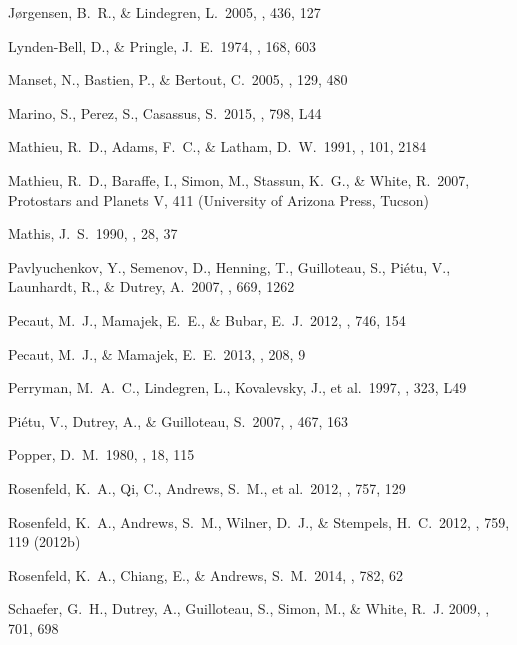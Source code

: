 \documentclass{aastex6}
\begin{document}
\begin{thebibliography}{}
 J{\o}rgensen, B.~R., \& Lindegren, L.\ 2005, \aap, 436, 127 

 Lynden-Bell, D., \& Pringle, J.~E.\ 1974, \mnras, 168, 603

 Manset, N., Bastien, P., 
\& Bertout, C.\ 2005, \aj, 129, 480 

 Marino, S., Perez, S., Casassus, S.\ 2015, \apj, 798, L44

 Mathieu, R.~D., Adams, 
F.~C., \& Latham, D.~W.\ 1991, \aj, 101, 2184 

 Mathieu, R.~D., 
Baraffe, I., Simon, M., Stassun, K.~G., 
\& White, R.\ 2007, Protostars and Planets V, 411 (University of Arizona Press, Tucson)

 Mathis, J.~S.\ 1990, \araa, 28, 37

 Pavlyuchenkov, Y., Semenov, D., Henning, T., Guilloteau, S., Pi{\'e}tu, V., Launhardt, R., \& Dutrey, A.\ 2007, \apj, 669, 1262

 Pecaut, M.~J., Mamajek, 
E.~E., \& Bubar, E.~J.\ 2012, \apj, 746, 154 

 Pecaut, M.~J., \& Mamajek, E.~E.\ 2013, \apjs, 208, 9

 Perryman, M.~A.~C., Lindegren, L., Kovalevsky, J., et al.\ 1997, \aap, 323, L49 

 Pi{\'e}tu, V., Dutrey, A., \& Guilloteau, S.\ 2007, \aap, 467, 163

 Popper, D.~M.\ 1980, \araa, 18, 115

 Rosenfeld, K.~A., Qi, C., Andrews, S.~M., et al.\ 2012, \apj, 757, 129 

 Rosenfeld, K.~A., Andrews, S.~M., Wilner, D.~J., \& Stempels, H.~C.\ 2012, \apj, 759, 119 (2012b)

 Rosenfeld, K.~A., Chiang, E., \& Andrews, S.~M.\ 2014, \apj, 782, 62
  
 Schaefer, G.~H., Dutrey, A., Guilloteau, S., Simon, M., \& White, R.~J. 2009, \apj, 701, 698


\end{thebibliography}
\end{document}
